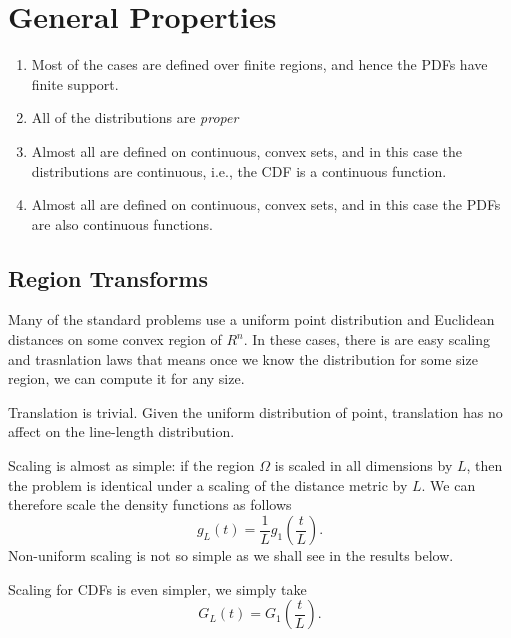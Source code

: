 \documentclass{article}
\begin{document}
\section{General Properties}
\label{sec:general}

\begin{enumerate}

\item Most of the cases are defined over finite regions, and hence the
  PDFs have finite support.

\item All of the distributions are {\em proper}

\item Almost all are defined on continuous, convex sets, and in this
  case the distributions are continuous, i.e., the CDF is a continuous
  function.

\item Almost all are defined on continuous, convex sets, and in this
  case the PDFs are also continuous functions.

\end{enumerate}

\subsection{Region Transforms}
\label{sec:scaling}

Many of the standard problems use a uniform point distribution and
Euclidean distances on some convex region of $R^n$. In these cases,
there is are easy scaling and trasnlation laws that means once we know
the distribution for some size region, we can compute it for any size.

Translation is trivial. Given the uniform distribution of point,
translation has no affect on the line-length distribution.

Scaling is almost as simple: if the region $\Omega$ is scaled in all
dimensions by $L$, then the problem is identical under a scaling of
the distance metric by $L$. We can therefore scale the density
functions as follows
\begin{equation}
   g_L(t) = \frac{1}{L} g_1 \left( \frac{t}{L} \right). 
\end{equation}
Non-uniform scaling is not so simple as we shall see in the results
below.

Scaling for CDFs is even simpler, we simply take
\begin{equation}
   G_L(t) = G_1 \left( \frac{t}{L} \right). 
\end{equation}
\end{document}
